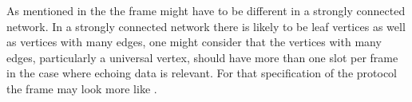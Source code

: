 As mentioned in the  the frame might have to be different in a strongly connected network.
In a strongly connected network there is likely to be leaf vertices as well as vertices with many edges, one might consider that the vertices with many edges, particularly a universal vertex, should have more than one slot per frame in the case where echoing data is relevant.
For that specification of the protocol the frame may look more like .
